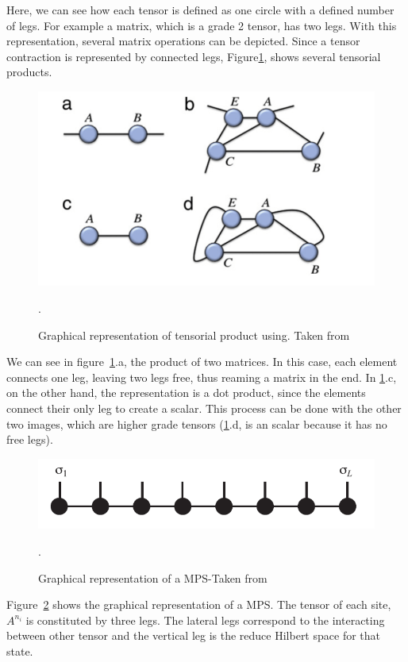 \documentclass{article}
\begin{document}
Here, we can see how each tensor is defined as one circle with a defined number of legs. For example a matrix, which is a grade 2 tensor, has two legs. With this representation, several matrix operations can be depicted. Since a tensor contraction is represented by connected legs, Figure\ref{Blocks}, shows several tensorial products.

\begin{figure}
    \centering
    \includegraphics[scale=0.6]{TensorProduct.PNG}
    \caption{Graphical representation of tensorial product using. Taken from \cite{ORUS2014117}}.
    \label{Blocks}
\end{figure}

We can see in figure~\ref{Blocks}.a, the product of two matrices. In this case, each element connects one leg, leaving two legs free, thus reaming a matrix in the end. In \ref{Blocks}.c, on the other hand, the representation is a dot product, since the elements connect their only leg to create a scalar. This process can be done with the other two images, which are higher grade tensors (\ref{Blocks}.d, is an scalar because it has no free legs).

\begin{figure}
    \centering
    \includegraphics[scale=0.5]{MPS.PNG}
    \caption{Graphical representation of a MPS-Taken from \cite{DMRG}}.
    \label{MPS}
\end{figure}

Figure~\ref{MPS} shows the graphical representation of a MPS. The tensor of each site, $A^{n_i}$ is constituted by three legs. The lateral legs correspond to the interacting between other tensor and the vertical leg is the reduce Hilbert space for that state.
\end{document}
